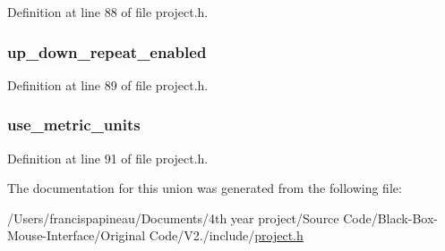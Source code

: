 \-Definition at line 88 of file project.\-h.

\hypertarget{unions__system__flags_a47613fdc4c935cabe322cb63cac9150d}{
\subsubsection[{up\-\_\-down\-\_\-repeat\-\_\-enabled}]{ {\bf up\-\_\-down\-\_\-repeat\-\_\-enabled}}}\label{unions__system__flags_a47613fdc4c935cabe322cb63cac9150d}


\-Definition at line 89 of file project.\-h.

\hypertarget{unions__system__flags_a98d55100d4348e9980fe36505551b5d8}{
\subsubsection[{use\-\_\-metric\-\_\-units}]{ {\bf use\-\_\-metric\-\_\-units}}}\label{unions__system__flags_a98d55100d4348e9980fe36505551b5d8}


\-Definition at line 91 of file project.\-h.



\-The documentation for this union was generated from the following file\-:\begin{DoxyCompactItemize}
\item 
/\-Users/francispapineau/\-Documents/4th year project/\-Source Code/\-Black-\/\-Box-\/\-Mouse-\/\-Interface/\-Original Code/\-V2./include/\hyperlink{project_8h}{project.\-h}\end{DoxyCompactItemize}
